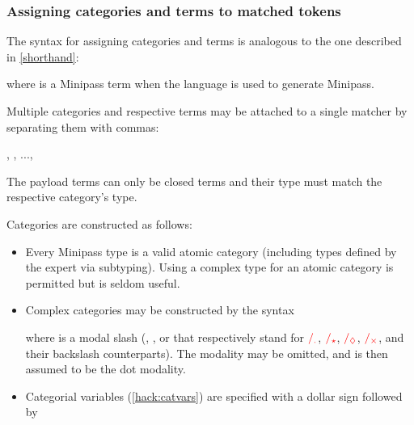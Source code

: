 \documentclass[main.tex]{subfiles}
\begin{document}
\subsubsection{Assigning categories and terms to matched tokens}
The syntax for assigning categories and terms is analogous to the one described
in \cref{shorthand}:
\begin{center}
    \code{:}
\end{center}
where  is a Minipass term when the language is used to generate
Minipass.

Multiple categories and respective terms may be attached to a single
matcher by separating them with commas:
\begin{center}
    \code{:},
    , ...,
\end{center}

The payload terms can only be closed terms and their type must match the
respective category's type.

Categories are constructed as follows:
\begin{itemize}
    \item Every Minipass type is a valid atomic category (including types defined
        by the expert via subtyping). Using a complex type for an atomic
        category is permitted but is seldom useful.
    \item Complex categories may be constructed by the syntax
        \begin{center}
        \end{center}
        where  is a modal slash (, ,
         or  that respectively stand for $\textcolor{red}{/_{.}}$,
        $\textcolor{red}{/_{\star}}$, $\textcolor{red}{/_{\lozenge}}$, $\textcolor{red}{/_{\times}}$, and their backslash
        counterparts). The modality may be omitted, and is then assumed to be
        the dot modality.
    \item Categorial variables (\cref{hack:catvars}) are specified with a
        dollar sign followed by \code{[a-zA-Z][a-zA-Z0-9\_]*}
\end{itemize}
\end{document}
